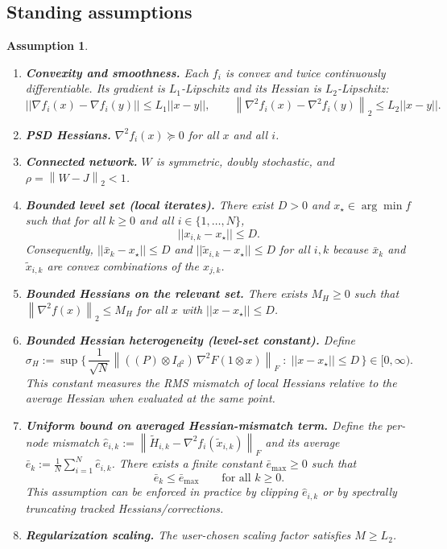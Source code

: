 \documentclass[11pt,a4paper]{article}
\def\one{1}%
\def\J{J}%
\def\Pmat{P}%
\def\norm#1{||#1||}%
\newtheorem{assumption}[theorem]{Assumption}
\newcommand{\one}{\mathbf{1}}
\newcommand{\norm}[1]{\left\|#1\right\|}
\newcommand{\normtwo}[1]{\left\|#1\right\|_2}
\newcommand{\normF}[1]{\left\|#1\right\|_F}
\newcommand{\J}{\left(\frac{1}{N}\one\one^\top\right)}
\newcommand{\Pmat}{I-\J}
\begin{document}
	\subsection{Standing assumptions}
	\begin{assumption}\label{ass:standing}
		\begin{enumerate}\itemsep2pt
			\item \textbf{Convexity and smoothness.}
			Each $f_i$ is convex and twice continuously differentiable.
			Its gradient is $L_1$-Lipschitz and its Hessian is $L_2$-Lipschitz:
			\[
			\norm{\nabla f_i(x)-\nabla f_i(y)}\le L_1\norm{x-y},
			\qquad
			\normtwo{\nabla^2 f_i(x)-\nabla^2 f_i(y)}\le L_2\norm{x-y}.
			\]
			\item \textbf{PSD Hessians.} $\nabla^2 f_i(x)\succeq0$ for all $x$ and all $i$.
			\item \textbf{Connected network.} $W$ is symmetric, doubly stochastic, and $\rho=\normtwo{W-\J}<1$.
			\item \textbf{Bounded level set (local iterates).} There exist $D>0$ and $x_\star\in\arg\min f$ such that for all $k\ge 0$ and all $i\in\{1,\dots,N\}$,
			\begin{equation}\label{eq:bounded_levelset}
				\norm{x_{i,k}-x_\star}\le D.
			\end{equation}
			Consequently, $\norm{\bar x_k-x_\star}\le D$ and $\norm{\tilde x_{i,k}-x_\star}\le D$ for all $i,k$ because $\bar x_k$ and $\tilde x_{i,k}$ are convex combinations of the $x_{j,k}$.
			\item \textbf{Bounded Hessians on the relevant set.}
			There exists $M_H\ge0$ such that $\normtwo{\nabla^2 f(x)}\le M_H$ for all $x$ with $\norm{x-x_\star}\le D$.
			\item \textbf{Bounded Hessian heterogeneity (level-set constant).}
			Define
			\begin{equation}\label{eq:sigma_H_def}
				\sigma_H := \sup\Big\{\, \frac{1}{\sqrt N}\normF{((\Pmat)\otimes I_{d^2})\,\nabla^2 F(\one\otimes x)}\;:\; \norm{x-x_\star}\le D\,\Big\}\in[0,\infty).
			\end{equation}
			This constant measures the RMS mismatch of local Hessians relative to the average Hessian when evaluated at the same point.
			\item \textbf{Uniform bound on averaged Hessian-mismatch term.} Define the per-node mismatch
			$\hat e_{i,k}:=\normF{\tilde H_{i,k}-\nabla^2 f_i(\tilde x_{i,k})}$ and its average $\bar e_k:=\frac1N\sum_{i=1}^N\hat e_{i,k}$.
			There exists a finite constant $\bar e_{\max}\ge 0$ such that
			\begin{equation}\label{eq:ebar_max}
				\bar e_k\le \bar e_{\max}\qquad\text{for all }k\ge 0.
			\end{equation}
			This assumption can be enforced in practice by clipping $\hat e_{i,k}$ or by spectrally truncating tracked Hessians/corrections.
			\item \textbf{Regularization scaling.} The user-chosen scaling factor satisfies $M\ge L_2$.
		\end{enumerate}
	\end{assumption}
	
\end{document}
